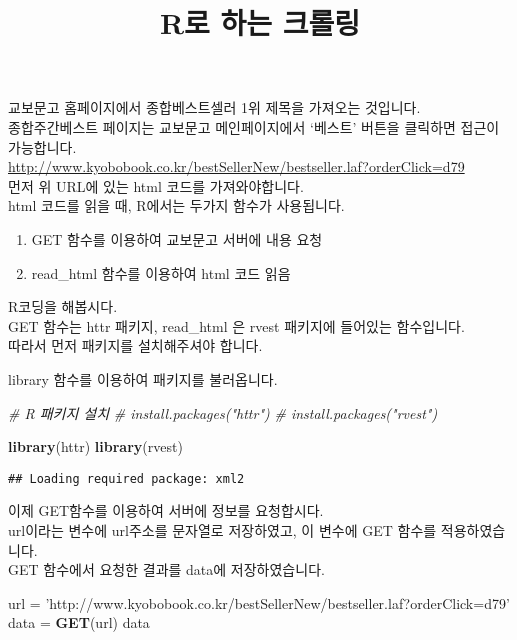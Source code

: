 \documentclass[
]{article}
\title{R로 하는 크롤링}
\author{}
\date{\vspace{-2.5em}}
\newenvironment{Shaded}{\begin{snugshade}}{\end{snugshade}}
\newcommand{\CommentTok}[1]{\textcolor[rgb]{0.56,0.35,0.01}{\textit{#1}}}
\newcommand{\KeywordTok}[1]{\textcolor[rgb]{0.13,0.29,0.53}{\textbf{#1}}}
\newcommand{\NormalTok}[1]{#1}
\newcommand{\StringTok}[1]{\textcolor[rgb]{0.31,0.60,0.02}{#1}}
\providecommand{\tightlist}{%
  \setlength{\itemsep}{0pt}\setlength{\parskip}{0pt}}
\begin{document}
\maketitle

교보문고 홈페이지에서 종합베스트셀러 1위 제목을 가져오는 것입니다.\\
종합주간베스트 페이지는 교보문고 메인페이지에서 `베스트' 버튼을 클릭하면
접근이 가능합니다.\\
\url{http://www.kyobobook.co.kr/bestSellerNew/bestseller.laf?orderClick=d79}~\\
먼저 위 URL에 있는 html 코드를 가져와야합니다.\\
html 코드를 읽을 때, R에서는 두가지 함수가 사용됩니다.

\begin{enumerate}
\def\labelenumi{\arabic{enumi})}
\tightlist
\item
  GET 함수를 이용하여 교보문고 서버에 내용 요청
\item
  read\_html 함수를 이용하여 html 코드 읽음
\end{enumerate}

R코딩을 해봅시다.\\
GET 함수는 httr 패키지, read\_html 은 rvest 패키지에 들어있는
함수입니다.\\
따라서 먼저 패키지를 설치해주셔야 합니다.

library 함수를 이용하여 패키지를 불러옵니다.

\begin{Shaded}
\begin{Highlighting}[]
\CommentTok{# R 패키지 설치}
\CommentTok{# install.packages("httr")}
\CommentTok{# install.packages("rvest")}

\KeywordTok{library}\NormalTok{(httr)}
\KeywordTok{library}\NormalTok{(rvest)}
\end{Highlighting}
\end{Shaded}

\begin{verbatim}
## Loading required package: xml2
\end{verbatim}

이제 GET함수를 이용하여 서버에 정보를 요청합시다.\\
url이라는 변수에 url주소를 문자열로 저장하였고, 이 변수에 GET 함수를
적용하였습니다.\\
GET 함수에서 요청한 결과를 data에 저장하였습니다.

\begin{Shaded}
\begin{Highlighting}[]
\NormalTok{url =}\StringTok{ 'http://www.kyobobook.co.kr/bestSellerNew/bestseller.laf?orderClick=d79'}
\NormalTok{data =}\StringTok{ }\KeywordTok{GET}\NormalTok{(url)}
\NormalTok{data}
\end{Highlighting}
\end{Shaded}
\end{document}
